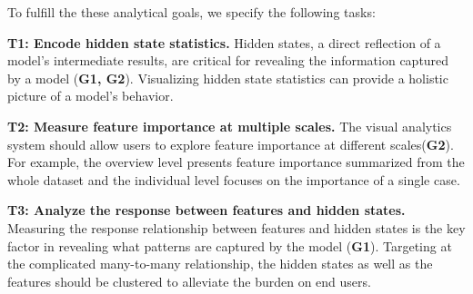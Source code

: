 To fulfill the these analytical goals, we specify the following tasks:

\textbf{T1: Encode hidden state statistics.}
Hidden states, a direct reflection of a model's intermediate results, are critical for revealing the information captured by a model (\textbf{G1, G2}).
Visualizing hidden state statistics can provide a holistic picture of a model's behavior.

\textbf{T2: Measure feature importance at multiple scales.}
The visual analytics system should allow users to explore feature importance at different scales(\textbf{G2}). 
For example, the overview level presents feature importance summarized from the whole dataset and the individual level focuses on the importance of a single case.


\textbf{T3: Analyze the response between features and hidden states.}
Measuring the response relationship between features and hidden states is the key factor in revealing what patterns are captured by the model (\textbf{G1}). 
Targeting at the complicated many-to-many relationship, the hidden states as well as the features should be clustered to alleviate the burden on end users. 


